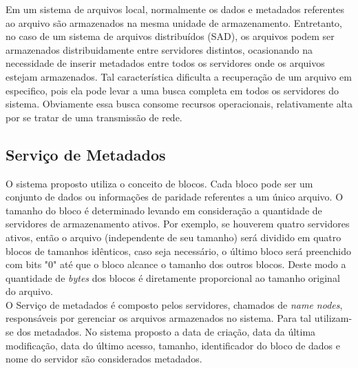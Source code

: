 Em um sistema de arquivos local, normalmente os dados e metadados referentes ao arquivo são armazenados na mesma unidade de armazenamento. Entretanto, no caso de um sistema de arquivos distribuídos (SAD), os arquivos podem ser armazenados distribuidamente entre servidores distintos, ocasionando na necessidade de inserir metadados entre todos os servidores onde os arquivos estejam armazenados. Tal característica dificulta a recuperação de um arquivo em especifico, pois ela pode levar a uma busca completa em todos os servidores do sistema. Obviamente essa busca consome recursos operacionais, relativamente alta por se tratar de uma transmissão de rede.
   \\

		

\subsection{Serviço de Metadados}

O sistema proposto utiliza o conceito de blocos. Cada bloco pode ser um conjunto de dados ou informações de paridade referentes a um único arquivo. O tamanho do bloco é determinado levando em consideração a quantidade de servidores de armazenamento ativos. Por exemplo, se houverem quatro servidores ativos, então o arquivo (independente de seu tamanho) será dividido em quatro blocos de tamanhos idênticos, caso seja necessário, o último bloco será preenchido com bits "0" até que o bloco alcance o tamanho dos outros blocos. Deste modo a quantidade de \textit{bytes} dos blocos é diretamente proporcional ao tamanho original do arquivo.
\\ 

O Serviço de metadados é composto pelos servidores, chamados de \textit{name nodes}, responsáveis por gerenciar os arquivos armazenados no sistema. Para tal utilizam-se dos metadados. No sistema proposto a data de criação, data da última modificação, data do último acesso, tamanho, identificador do bloco de dados e nome do servidor são considerados metadados. 
\\

